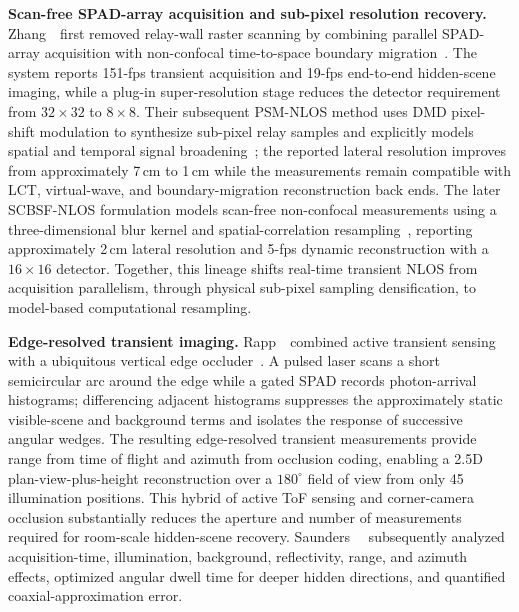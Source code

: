 \vspace{0.8mm}
\noindent \textbf{Scan-free SPAD-array acquisition and sub-pixel resolution recovery.}
Zhang~\etal~first removed relay-wall raster scanning by combining parallel SPAD-array acquisition with non-confocal time-to-space boundary migration~\cite{zhangRealTimeScanFreeNLOS2024}. The system reports 151-fps transient acquisition and 19-fps end-to-end hidden-scene imaging, while a plug-in super-resolution stage reduces the detector requirement from $32\times32$ to $8\times8$. Their subsequent PSM-NLOS method uses DMD pixel-shift modulation to synthesize sub-pixel relay samples and explicitly models spatial and temporal signal broadening~\cite{zhangSubpixelModulation2025}; the reported lateral resolution improves from approximately 7\,cm to 1\,cm while the measurements remain compatible with LCT, virtual-wave, and boundary-migration reconstruction back ends. The later SCBSF-NLOS formulation models scan-free non-confocal measurements using a three-dimensional blur kernel and spatial-correlation resampling~\cite{zhangSpatialCorrelationNLOS2025}, reporting approximately 2\,cm lateral resolution and 5-fps dynamic reconstruction with a $16\times16$ detector. Together, this lineage shifts real-time transient NLOS from acquisition parallelism, through physical sub-pixel sampling densification, to model-based computational resampling.

\vspace{0.8mm}
\noindent \textbf{Edge-resolved transient imaging.}
Rapp~\etal~combined active transient sensing with a ubiquitous vertical edge occluder~\cite{rappEdgeResolvedTransient2020}. A pulsed laser scans a short semicircular arc around the edge while a gated SPAD records photon-arrival histograms; differencing adjacent histograms suppresses the approximately static visible-scene and background terms and isolates the response of successive angular wedges. The resulting edge-resolved transient measurements provide range from time of flight and azimuth from occlusion coding, enabling a 2.5D plan-view-plus-height reconstruction over a $180^\circ$ field of view from only 45 illumination positions. This hybrid of active ToF sensing and corner-camera occlusion substantially reduces the aperture and number of measurements required for room-scale hidden-scene recovery. Saunders~\etal~\cite{saundersERTIPerformance2021} subsequently analyzed acquisition-time, illumination, background, reflectivity, range, and azimuth effects, optimized angular dwell time for deeper hidden directions, and quantified coaxial-approximation error.

